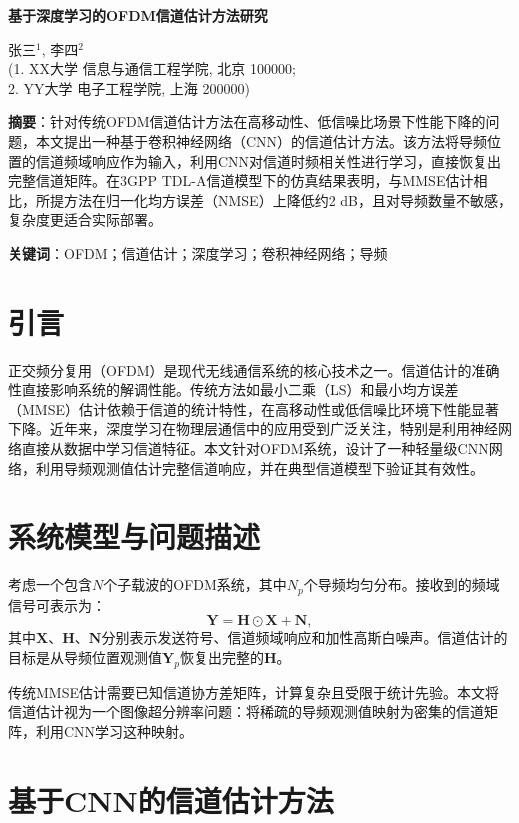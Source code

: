 \documentclass[twocolumn]{ctexart}
\newcommand\Title[1]{\begin{center}\LARGE\bfseries #1\end{center}}
\newcommand\Author[1]{\begin{center}\large #1\end{center}}
\newcommand\Abstract[1]{\textbf{\abstractname}：#1\par}
\newcommand\Keywords[1]{\textbf{关键词}：#1\par}
\begin{document}
\Title{基于深度学习的OFDM信道估计方法研究}

\Author{张三$^{1}$, 李四$^{2}$\\
(1. XX大学 信息与通信工程学院, 北京 100000;\\
2. YY大学 电子工程学院, 上海 200000)}

\renewcommand{\abstractname}{摘\quad 要}
\Abstract{针对传统OFDM信道估计方法在高移动性、低信噪比场景下性能下降的问题，本文提出一种基于卷积神经网络（CNN）的信道估计方法。该方法将导频位置的信道频域响应作为输入，利用CNN对信道时频相关性进行学习，直接恢复出完整信道矩阵。在3GPP TDL-A信道模型下的仿真结果表明，与MMSE估计相比，所提方法在归一化均方误差（NMSE）上降低约2 dB，且对导频数量不敏感，复杂度更适合实际部署。}

\Keywords{OFDM；信道估计；深度学习；卷积神经网络；导频}

\section{引言}

正交频分复用（OFDM）是现代无线通信系统的核心技术之一。信道估计的准确性直接影响系统的解调性能。传统方法如最小二乘（LS）和最小均方误差（MMSE）估计依赖于信道的统计特性，在高移动性或低信噪比环境下性能显著下降\cite{1}。近年来，深度学习在物理层通信中的应用受到广泛关注，特别是利用神经网络直接从数据中学习信道特征\cite{2,3}。本文针对OFDM系统，设计了一种轻量级CNN网络，利用导频观测值估计完整信道响应，并在典型信道模型下验证其有效性。

\section{系统模型与问题描述}

考虑一个包含$N$个子载波的OFDM系统，其中$N_p$个导频均匀分布。接收到的频域信号可表示为：
\begin{equation}
\mathbf{Y} = \mathbf{H} \odot \mathbf{X} + \mathbf{N},
\end{equation}
其中$\mathbf{X}$、$\mathbf{H}$、$\mathbf{N}$分别表示发送符号、信道频域响应和加性高斯白噪声。信道估计的目标是从导频位置观测值$\mathbf{Y}_p$恢复出完整的$\mathbf{H}$。

传统MMSE估计需要已知信道协方差矩阵，计算复杂且受限于统计先验。本文将信道估计视为一个图像超分辨率问题：将稀疏的导频观测值映射为密集的信道矩阵，利用CNN学习这种映射。

\section{基于CNN的信道估计方法}
\end{document}
